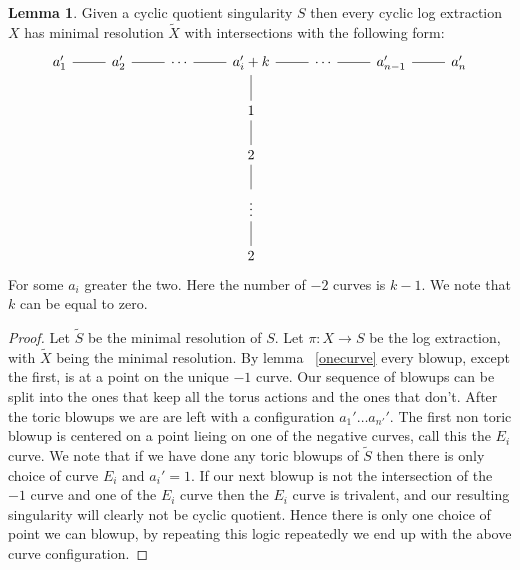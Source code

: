 \documentclass[11pt]{amsart}
\theoremstyle{definition}
\theoremstyle{definition}
\theoremstyle{definition}
\theoremstyle{definition}
\theoremstyle{definition}
\newtheorem{lem}[thm]{Lemma}
\theoremstyle{definition}
\theoremstyle{definition}
\theoremstyle{definition}
\newcommand{\wt}[1]{\widetilde{#1}}
\begin{document}
\begin{lem}
Given a cyclic quotient singularity $S$ then every cyclic log extraction $X$ has minimal resolution $\wt{X}$ with intersections with the following form:
\[
\begin{tikzcd}
a_1' \arrow[r, no head] & a_2' \arrow[r, no head] & \cdots \arrow[r, no head] & a_i' + k \arrow[r, no head] \arrow[d, no head] & \cdots  \arrow[r, no head] & a_{n-1}' \arrow[r, no head] & a_n' \\
                       &                        &                           & 1                                             &                            &                            &     \\
                       &                        &                           & 2 \arrow[u, no head]                          &                            &                            &     \\
                       &                        &                           & \vdots \arrow[d, no head] \arrow[u, no head]  &                            &                            &     \\
                       &                        &                           & 2                                             &                            &                            &    
\end{tikzcd}
\]
For some $a_i$ greater the two. Here the number of $-2$ curves is $k-1$. We note that $k$ can be equal to zero.
\end{lem}

\begin{proof}
Let $\widetilde{S}$ be the minimal resolution of $S$. Let $\pi : X \rightarrow S$ be the log extraction, with $\widetilde{X}$ being the minimal resolution. By lemma ~\ref{onecurve} every  blowup, except the first, is at a point on the unique $-1$ curve. Our sequence of blowups can be split into the ones that keep all the torus actions and the ones that don't. After the toric blowups we are are left with a configuration $a_1' \dots a_{n'}'$. The first non toric blowup is centered on a point lieing on one of the negative curves, call this the $E_i$ curve. We note that if we have done any toric blowups of $\wt{S}$ then there is only choice of curve $E_i$ and $a_i' = 1$. If our next blowup is not the intersection of the $-1$ curve and one of the $E_i$ curve then the $E_i$ curve is trivalent, and our resulting singularity will clearly not be cyclic quotient. Hence there is only one choice of point we can blowup, by repeating this logic repeatedly we end up with the above curve configuration.
\end{proof}
\end{document}
